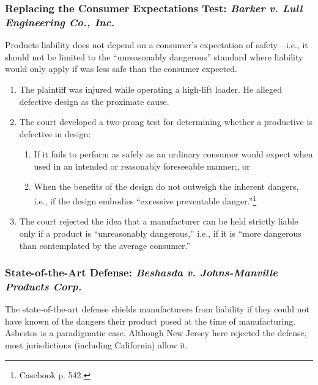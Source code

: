\subsubsection{Replacing the Consumer Expectations Test: \emph{Barker v. Lull 
Engineering Co., Inc.}}

Products liability does not depend on a consumer's expectation of 
safety---i.e., it should not be limited to the ``unreasonably dangerous'' 
standard where liability would only apply if was less safe than the consumer 
expected.

\begin{enumerate}
    \item The plaintiff was injured while operating a high-lift loader. He 
    alleged defective design as the proximate cause.
    \item The court developed a two-prong test for determining whether a 
    productive is defective in design:
    \begin{enumerate}
        \item If it fails to perform as safely as an ordinary consumer would 
        expect when used in an intended or reasonably foreseeable manner;, or
        \item When the benefits of the design do not outweigh the inherent 
        dangers, i.e., if the design embodies ``excessive preventable 
        danger.''\footnote{Casebook p. 542.}
    \end{enumerate}
    \item The court rejected the idea that a manufacturer can be held strictly 
    liable only if a product is ``unreasonably dangerous,'' i.e., if it is 
    ``more dangerous than contemplated by the average consumer.''
\end{enumerate}

\subsubsection{State-of-the-Art Defense: \emph{Beshasda v. Johns-Manville 
Products Corp.}}

The state-of-the-art defense shields manufacturers from liability if they 
could not have known of the dangers their product posed at the time of 
manufacturing. Asbestos is a paradigmatic case. Although New Jersey here 
rejected the defense, most jurisdictions (including California) allow it.

